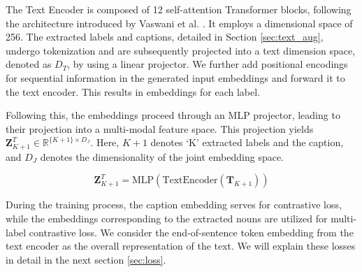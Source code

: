 The Text Encoder is composed of 12 self-attention Transformer blocks, following the architecture introduced by Vaswani et al. \cite{vaswani2017attention}. It employs a dimensional space of 256. The extracted labels and captions, detailed in Section \ref{sec:text_aug}, undergo tokenization and are subsequently projected into a text dimension space, denoted as $D_T$, by using a linear projector. We further add positional encodings for sequential information in the generated input embeddings and forward it to the text encoder. This results in embeddings for each label.

Following this, the embeddings proceed through an MLP projector, leading to their projection into a multi-modal feature space. This projection yields $\mathbf{Z}^T_{K+1} \in \mathbb{R}^{\{K+1\} \times D_J}$. Here, $K+1$ denotes `K' extracted labels and the caption, and $D_J$ denotes the dimensionality of the joint embedding space.

\begin{equation}
\label{eq:textproj}
 {\textbf{Z}^T_{K+1}} = \text{MLP}(\text{TextEncoder}( {\textbf{T}_{K+1}}))
\end{equation}


During the training process, the caption embedding serves for contrastive loss, while the embeddings corresponding to the extracted nouns are utilized for multi-label contrastive loss. We consider the end-of-sentence token embedding from the text encoder as the overall representation of the text. We will explain these losses in detail in the next section \ref{sec:loss}.


